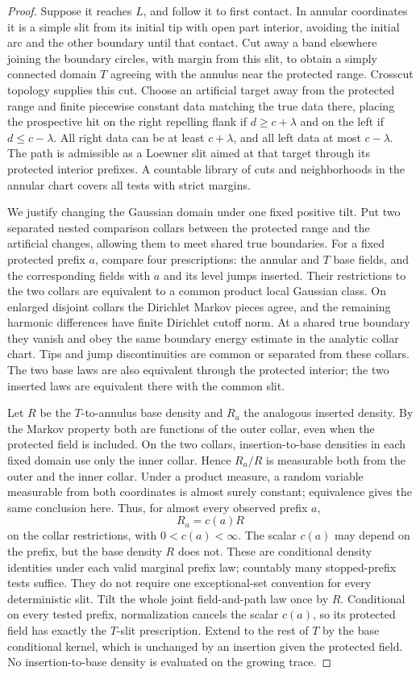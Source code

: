 \begin{proof}
Suppose it reaches $L$, and follow it to first contact.  In annular coordinates it is a simple slit from its initial tip with open part interior, avoiding the initial arc and the other boundary until that contact.  Cut away a band elsewhere joining the boundary circles, with margin from this slit, to obtain a simply connected domain $T$ agreeing with the annulus near the protected range.  Crosscut topology supplies this cut.  Choose an artificial target away from the protected range and finite piecewise constant data matching the true data there, placing the prospective hit on the right repelling flank if $d\ge c+\lambda$ and on the left if $d\le c-\lambda$.  All right data can be at least $c+\lambda$, and all left data at most $c-\lambda$.  The path is admissible as a Loewner slit aimed at that target through its protected interior prefixes.  A countable library of cuts and neighborhoods in the annular chart covers all tests with strict margins.

We justify changing the Gaussian domain under one fixed positive tilt.  Put two separated nested comparison collars between the protected range and the artificial changes, allowing them to meet shared true boundaries.  For a fixed protected prefix $a$, compare four prescriptions: the annular and $T$ base fields, and the corresponding fields with $a$ and its level jumps inserted.  Their restrictions to the two collars are equivalent to a common product local Gaussian class.  On enlarged disjoint collars the Dirichlet Markov pieces agree, and the remaining harmonic differences have finite Dirichlet cutoff norm.  At a shared true boundary they vanish and obey the same boundary energy estimate in the analytic collar chart.  Tips and jump discontinuities are common or separated from these collars.  The two base laws are also equivalent through the protected interior; the two inserted laws are equivalent there with the common slit.

Let $R$ be the $T$-to-annulus base density and $R_a$ the analogous inserted density.  By the Markov property both are functions of the outer collar, even when the protected field is included.  On the two collars, insertion-to-base densities in each fixed domain use only the inner collar.  Hence $R_a/R$ is measurable both from the outer and the inner collar.
Under a product measure, a random variable measurable from both coordinates
is almost surely constant; equivalence gives the same conclusion here.
Thus, for almost every observed prefix $a$,
\[
 R_a=c(a)R
\]
on the collar restrictions, with $0<c(a)<\infty$. The scalar $c(a)$ may
depend on the prefix, but the base density $R$ does not. These are
conditional density identities under each valid marginal prefix law;
countably many stopped-prefix tests suffice. They do not require one
exceptional-set convention for every deterministic slit.  Tilt the whole joint field-and-path law once by $R$.  Conditional on every tested prefix, normalization cancels the scalar $c(a)$,
so its protected field has exactly the $T$-slit prescription.  Extend to the rest of $T$ by the base conditional kernel, which is unchanged by an insertion given the protected field.  No insertion-to-base density is evaluated on the growing trace.


\end{proof}
